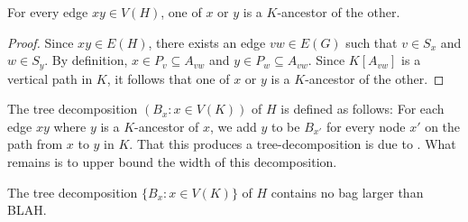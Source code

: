 \documentclass{patmorin}
\begin{document}
\begin{clm}
   For every edge $xy\in V(H)$, one of $x$ or $y$ is a $K$-ancestor of the other.
 \end{clm}
 
 \begin{proof}
   Since $xy\in E(H)$, there exists an edge $vw\in E(G)$ such that $v\in S_x$ and $w\in S_y$.  By definition, $x\in P_v\subseteq A_{vw}$ and $y\in P_w\subseteq A_{vw}$.  Since $K[A_{vw}]$ is a vertical path in $K$, it follows that one of $x$ or $y$ is a $K$-ancestor of the other. 
\end{proof}

The tree decomposition $(B_x:x\in V(K))$ of $H$ is defined as follows: For each edge $xy$ where $y$ is a $K$-ancestor of $x$, we add $y$ to be $B_{x'}$ for every node $x'$ on the path from $x$ to $y$ in $K$.  That this produces a tree-decomposition is due to .  What remains is to upper bound the width of this decomposition.

\begin{clm}
  The tree decomposition $\{B_x: x\in V(K)\}$ of $H$ contains no bag larger than BLAH.
\end{clm}
\end{document}
